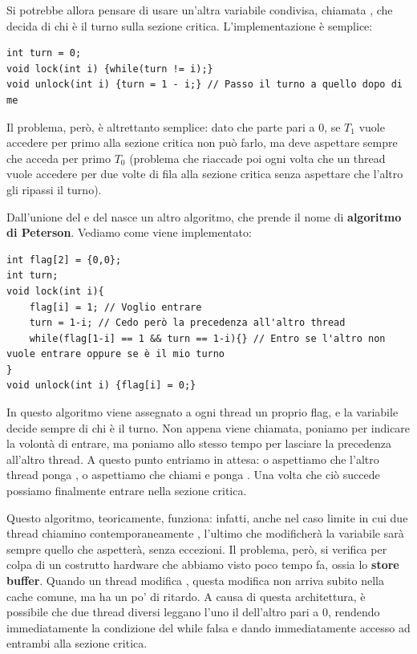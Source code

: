 \documentclass[11pt, a4paper, titlepage, oneside]{scrbook}
\begin{document}
Si potrebbe allora pensare di usare un'altra variabile condivisa, chiamata , che decida di chi è il turno sulla sezione critica. L'implementazione è semplice:
\begin{lstlisting}[style=C]
int turn = 0;
void lock(int i) {while(turn != i);}
void unlock(int i) {turn = 1 - i;} // Passo il turno a quello dopo di me
\end{lstlisting}

Il problema, però, è altrettanto semplice: dato che  parte pari a 0, se $T_1$ vuole accedere per primo alla sezione critica non può farlo, ma deve aspettare sempre che acceda per primo $T_0$ (problema che riaccade poi ogni volta che un thread vuole accedere per due volte di fila alla sezione critica senza aspettare che l'altro gli ripassi il turno).

Dall'unione del  e del  nasce un altro algoritmo, che prende il nome di \textbf{algoritmo di Peterson}. Vediamo come viene implementato:
\begin{lstlisting}[style=C]
int flag[2] = {0,0};
int turn;
void lock(int i){
    flag[i] = 1; // Voglio entrare
    turn = 1-i; // Cedo però la precedenza all'altro thread
    while(flag[1-i] == 1 && turn == 1-i){} // Entro se l'altro non vuole entrare oppure se è il mio turno
}
void unlock(int i) {flag[i] = 0;}
\end{lstlisting}

In questo algoritmo viene assegnato a ogni thread un proprio flag, e la variabile  decide sempre di chi è il turno. Non appena  viene chiamata, poniamo  per indicare la volontà di entrare, ma poniamo allo stesso tempo  per lasciare la precedenza all'altro thread. A questo punto entriamo in attesa: o aspettiamo che l'altro thread ponga , o aspettiamo che chiami  e ponga . Una volta che ciò succede possiamo finalmente entrare nella sezione critica. 

Questo algoritmo, teoricamente, funziona: infatti, anche nel caso limite in cui due thread chiamino contemporaneamente , l'ultimo che modificherà la variabile  sarà sempre quello che aspetterà, senza eccezioni. Il problema, però, si verifica per colpa di un costrutto hardware che abbiamo visto poco tempo fa, ossia lo \textbf{store buffer}. Quando un thread modifica , questa modifica non arriva subito nella cache comune, ma ha un po' di ritardo. A causa di questa architettura, è possibile che due thread diversi leggano l'uno il  dell'altro pari a 0, rendendo immediatamente la condizione del while falsa e dando immediatamente accesso ad entrambi alla sezione critica.
\end{document}
